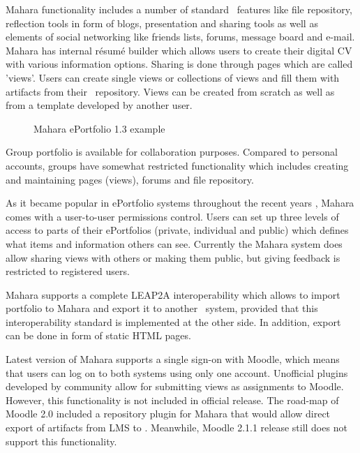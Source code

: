 Mahara functionality includes a number of standard \ep~features like file
repository, reflection tools in form of blogs, presentation and sharing tools as
well as elements of social networking like friends lists, forums, message board
and e-mail. Mahara has internal r\'{e}sum\'{e} builder which allows users to
create their digital CV with various information options. Sharing is done
through pages which are called 'views'. Users can create single views or
collections of views and fill them with artifacts from their \ep~repository.
Views can be created from scratch as well as from a template developed by
another user.

\begin{figure}[htb]
\centering
\setlength\fboxsep{0pt}
\setlength\fboxrule{0.5pt}
\caption{Mahara ePortfolio 1.3 example}
\label{fig:maharaep}
\end{figure}

Group portfolio is available for collaboration purposes. Compared to personal
accounts, groups have somewhat restricted functionality which includes creating
and maintaining pages (views), forums and file repository. 

As it became popular in ePortfolio systems throughout the recent years
\citep{Waters2009}, Mahara comes with a user-to-user permissions control. Users
can set up three levels of access to parts of their ePortfolios (private,
individual and public) which defines what items and information others can see.
Currently the Mahara system does allow sharing views with others or making them
public, but giving feedback is restricted to registered users.

Mahara supports a complete LEAP2A interoperability which allows to import
portfolio to Mahara and export it to another \ep~system, provided that this
interoperability standard is implemented at the other side. In addition, export
can be done in form of static HTML pages.

Latest version of Mahara supports a single sign-on with Moodle, which means that
users can log on to both systems using only one account. Unofficial plugins
developed by community allow for submitting views as assignments to Moodle.
However, this functionality is not included in official release. The road-map of
Moodle 2.0 included a repository plugin for Mahara that would allow direct
export of artifacts from LMS to \ep. Meanwhile, Moodle 2.1.1 release still does
not support this functionality.

